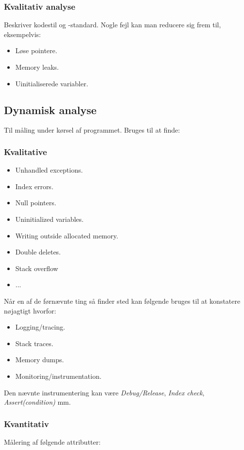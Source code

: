 \subsubsection{Kvalitativ analyse}
Beskriver kodestil og -standard. Nogle fejl kan man reducere sig frem til, eksempelvis: 

\begin{itemize}
	\item Løse pointere.
	\item Memory leaks.
	\item Uinitialiserede variabler.
\end{itemize}

\subsection{Dynamisk analyse}
Til måling under kørsel af programmet. Bruges til at finde: 

\subsubsection{Kvalitative}

\begin{itemize}
	\item Unhandled exceptions.
	\item Index errors.
	\item Null pointers.
	\item Uninitialized variables.
	\item Writing outside allocated memory.
	\item Double deletes.
	\item Stack overflow
	\item ...
\end{itemize}

Når en af de førnævnte ting så finder sted kan følgende bruges til at konstatere nøjagtigt hvorfor:

\begin{itemize}
	\item Logging/tracing.
	\item Stack traces.
	\item Memory dumps.
	\item Monitoring/instrumentation.
\end{itemize}

Den nævnte instrumentering kan være \textit{Debug/Release}, \textit{Index check}, \textit{Assert(condition)} mm.

\subsubsection{Kvantitativ}
Målering af følgende attributter:

